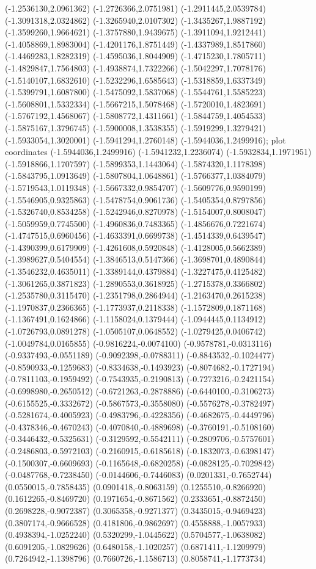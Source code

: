 {(-1.2536130,2.0961362) (-1.2726366,2.0751981) (-1.2911445,2.0539784) (-1.3091318,2.0324862) (-1.3265940,2.0107302) (-1.3435267,1.9887192) (-1.3599260,1.9664621) (-1.3757880,1.9439675) (-1.3911094,1.9212441) (-1.4058869,1.8983004) (-1.4201176,1.8751449) (-1.4337989,1.8517860) (-1.4469283,1.8282319) (-1.4595036,1.8044909) (-1.4715230,1.7805711) (-1.4829847,1.7564803) (-1.4938874,1.7322266) (-1.5042297,1.7078176) (-1.5140107,1.6832610) (-1.5232296,1.6585643) (-1.5318859,1.6337349) (-1.5399791,1.6087800) (-1.5475092,1.5837068) (-1.5544761,1.5585223) (-1.5608801,1.5332334) (-1.5667215,1.5078468) (-1.5720010,1.4823691) (-1.5767192,1.4568067) (-1.5808772,1.4311661) (-1.5844759,1.4054533) (-1.5875167,1.3796745) (-1.5900008,1.3538355) (-1.5919299,1.3279421) (-1.5933054,1.3020001) (-1.5941294,1.2760148) (-1.5944036,1.2499916)};
 plot coordinates {(-1.5944036,1.2499916) (-1.5941232,1.2236074) (-1.5932834,1.1971951) (-1.5918866,1.1707597) (-1.5899353,1.1443064) (-1.5874320,1.1178398) (-1.5843795,1.0913649) (-1.5807804,1.0648861) (-1.5766377,1.0384079) (-1.5719543,1.0119348) (-1.5667332,0.9854707) (-1.5609776,0.9590199) (-1.5546905,0.9325863) (-1.5478754,0.9061736) (-1.5405354,0.8797856) (-1.5326740,0.8534258) (-1.5242946,0.8270978) (-1.5154007,0.8008047) (-1.5059959,0.7745500) (-1.4960836,0.7483365) (-1.4856676,0.7221674) (-1.4747515,0.6960456) (-1.4633391,0.6699738) (-1.4514339,0.6439547) (-1.4390399,0.6179909) (-1.4261608,0.5920848) (-1.4128005,0.5662389) (-1.3989627,0.5404554) (-1.3846513,0.5147366) (-1.3698701,0.4890844) (-1.3546232,0.4635011) (-1.3389144,0.4379884) (-1.3227475,0.4125482) (-1.3061265,0.3871823) (-1.2890553,0.3618925) (-1.2715378,0.3366802) (-1.2535780,0.3115470) (-1.2351798,0.2864944) (-1.2163470,0.2615238) (-1.1970837,0.2366365) (-1.1773937,0.2118338) (-1.1572809,0.1871168) (-1.1367491,0.1624866) (-1.1158024,0.1379444) (-1.0944445,0.1134912) (-1.0726793,0.0891278) (-1.0505107,0.0648552) (-1.0279425,0.0406742) (-1.0049784,0.0165855) (-0.9816224,-0.0074100) (-0.9578781,-0.0313116) (-0.9337493,-0.0551189) (-0.9092398,-0.0788311) (-0.8843532,-0.1024477) (-0.8590933,-0.1259683) (-0.8334638,-0.1493923) (-0.8074682,-0.1727194) (-0.7811103,-0.1959492) (-0.7543935,-0.2190813) (-0.7273216,-0.2421154) (-0.6998980,-0.2650512) (-0.6721263,-0.2878886) (-0.6440100,-0.3106273) (-0.6155525,-0.3332672) (-0.5867573,-0.3558080) (-0.5576278,-0.3782497) (-0.5281674,-0.4005923) (-0.4983796,-0.4228356) (-0.4682675,-0.4449796) (-0.4378346,-0.4670243) (-0.4070840,-0.4889698) (-0.3760191,-0.5108160) (-0.3446432,-0.5325631) (-0.3129592,-0.5542111) (-0.2809706,-0.5757601) (-0.2486803,-0.5972103) (-0.2160915,-0.6185618) (-0.1832073,-0.6398147) (-0.1500307,-0.6609693) (-0.1165648,-0.6820258) (-0.0828125,-0.7029842) (-0.0487768,-0.7238450) (-0.0144606,-0.7446083) (0.0201331,-0.7652744) (0.0550015,-0.7858435) (0.0901418,-0.8063159) (0.1255510,-0.8266920) (0.1612265,-0.8469720) (0.1971654,-0.8671562) (0.2333651,-0.8872450) (0.2698228,-0.9072387) (0.3065358,-0.9271377) (0.3435015,-0.9469423) (0.3807174,-0.9666528) (0.4181806,-0.9862697) (0.4558888,-1.0057933) (0.4938394,-1.0252240) (0.5320299,-1.0445622) (0.5704577,-1.0638082) (0.6091205,-1.0829626) (0.6480158,-1.1020257) (0.6871411,-1.1209979) (0.7264942,-1.1398796) (0.7660726,-1.1586713) (0.8058741,-1.1773734) }
